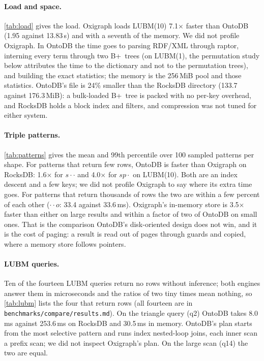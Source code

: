 \documentclass[sigconf, nonacm]{acmart}
\newcommand{\sys}{OntoDB}
\newcommand{\code}[1]{\texttt{#1}}
\begin{document}
\paragraph{Load and space.} \autoref{tab:load} gives the load. Oxigraph loads LUBM(10) 7.1$\times$ faster than \sys{} (1.95 against 13.83\,s) and with a seventh of the memory. We did not profile Oxigraph. In \sys{} the time goes to parsing RDF/XML through raptor, interning every term through two B+~trees (on LUBM(1), the permutation study below attributes the time to the dictionary and not to the permutation trees), and building the exact statistics; the memory is the 256\,MiB pool and those statistics. \sys's file is 24\% smaller than the RocksDB directory (133.7 against 176.3\,MiB): a bulk-loaded B+~tree is packed with no per-key overhead, and RocksDB holds a block index and filters, and compression was not tuned for either system.



\paragraph{Triple patterns.} \autoref{tab:patterns} gives the mean and 99th percentile over 100 sampled patterns per shape. For patterns that return few rows, \sys{} is faster than Oxigraph on RocksDB: 1.6$\times$ for $s\cdot\cdot$ and 4.0$\times$ for $sp\cdot$ on LUBM(10). Both are an index descent and a few keys; we did not profile Oxigraph to say where its extra time goes. For patterns that return thousands of rows the two are within a few percent of each other ($\cdot\cdot o$: 33.4 against 33.6\,ms). Oxigraph's in-memory store is 3.5$\times$ faster than either on large results and within a factor of two of \sys{} on small ones. That is the comparison \sys's disk-oriented design does not win, and it is the cost of paging: a result is read out of pages through guards and copied, where a memory store follows pointers.



\paragraph{LUBM queries.} Ten of the fourteen LUBM queries return no rows without inference; both engines answer them in microseconds and the ratios of two tiny times mean nothing, so \autoref{tab:lubm} lists the four that return rows (all fourteen are in \code{benchmarks/compare/results.md}). On the triangle query (q2) \sys{} takes 8.0\,ms against 253.6\,ms on RocksDB and 30.5\,ms in memory. \sys's plan starts from the most selective pattern and runs index nested-loop joins, each inner scan a prefix scan; we did not inspect Oxigraph's plan. On the large scan (q14) the two are equal.
\end{document}
